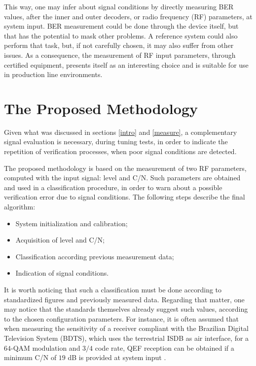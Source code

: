 \documentclass[conference]{IEEEtran}
\begin{document}
This way, one may infer about signal conditions by directly measuring BER values, after the inner and outer decoders, or radio frequency (RF) parameters, at system input. BER measurement could be done through the device itself, but that has the potential to mask other problems. A reference system could also perform that task, but, if not carefully chosen, it may also suffer from other issues. As a consequence, the measurement of RF input parameters, through certified equipment, presents itself as an interesting choice and is suitable for use in production line environments.

\section{The Proposed Methodology}\label{metho}
Given what was discussed in sections \ref{intro} and \ref{measure}, a complementary signal evaluation is necessary, during tuning tests, in order to indicate the repetition of verification processes, when poor signal conditions are detected. 

The proposed methodology is based on the measurement of two RF parameters, computed with the input signal: level and C/N. Such parameters are obtained and used in a classification procedure, in order to warn about a possible verification error due to signal conditions. The following steps describe the final algorithm:

\begin{itemize}
	\item System initialization and calibration;
	\item Acquisition of level and C/N;
	\item Classification according previous measurement data;
	\item Indication of signal conditions.
\end{itemize}

It is worth noticing that such a classification must be done according to standardized figures and previously measured data. Regarding that matter, one may notice that the standards themselves already suggest such values, according to the chosen configuration parameters. For instance, it is often assumed that when measuring the sensitivity of a receiver compliant with the Brazilian Digital Television System (BDTS), which uses the terrestrial ISDB as air interface, for a $64$-QAM modulation and $3/4$ code rate, QEF reception can be obtained if a minimum C/N of $19$ dB is provided at system input \cite{sbtvd}. 
\end{document}

